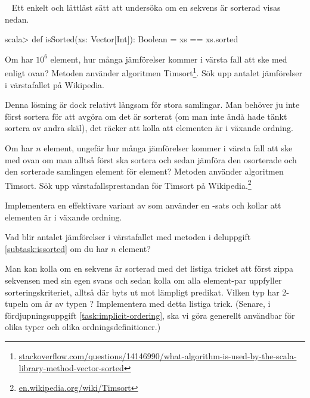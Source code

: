 \QUESTEND


\clearpage

\ExtraTasks %





\QUESTBEGIN

\Task \label{task:isSorted} \what~   Ett enkelt och lättläst sätt att undersöka om en sekvens är sorterad visas nedan.
\begin{REPL}
scala> def isSorted(xs: Vector[Int]): Boolean = xs == xs.sorted
\end{REPL}


\Subtask\Pen  Om  har $10^6$ element, hur många jämförelser kommer i värsta fall att ske med  enligt ovan? Metoden  använder algoritmen Timsort\footnote{\href{http://stackoverflow.com/questions/14146990/what-algorithm-is-used-by-the-scala-library-method-vector-sorted}{stackoverflow.com/questions/14146990/what-algorithm-is-used-by-the-scala-library-method-vector-sorted}}. Sök upp antalet jämförelser i värstafallet på Wikipedia.

Denna lösning är dock relativt långsam för stora samlingar. Man behöver ju inte först sortera  för att avgöra om det är sorterat (om man inte ändå hade tänkt sortera av andra skäl), det räcker att kolla att elementen är i växande ordning.

\Subtask\Pen  Om  har $n$ element, ungefär hur många jämförelser kommer i värsta fall att ske med  ovan om man alltså först ska sortera och sedan jämföra den osorterade och den sorterade samlingen element för element? Metoden  använder algoritmen Timsort. Sök upp värstafallsprestandan för Timsort på Wikipedia.\footnote{\href{https://en.wikipedia.org/wiki/Timsort}{en.wikipedia.org/wiki/Timsort}}

\Subtask\label{subtask:issorted} Implementera en effektivare variant av  som använder en -sats och kollar att elementen är i växande ordning.

\Subtask\Pen Vad blir antalet jämförelser i värstafallet med metoden i deluppgift \ref{subtask:issorted} om du har $n$ element?


\Subtask \label{subtask:isSorted-zip} Man kan kolla om en sekvens är sorterad med det listiga tricket att först zippa sekvensen med sin egen svans och sedan kolla om alla element-par uppfyller sorteringskriteriet, alltså  där  byts ut mot lämpligt predikat. Vilken typ har 2-tupeln  om  är av typen ? Implementera  med detta listiga trick. (Senare, i fördjupningsuppgift \ref{task:implicit-ordering}, ska vi göra  generellt användbar för olika typer och olika ordningsdefinitioner.)


